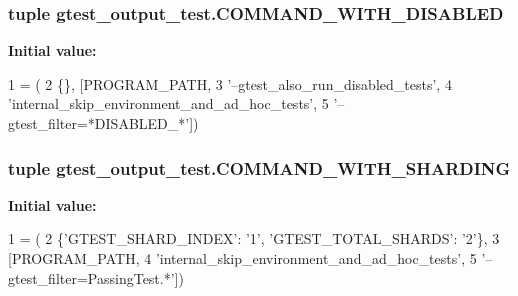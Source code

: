 \subsubsection[{\texorpdfstring{C\+O\+M\+M\+A\+N\+D\+\_\+\+W\+I\+T\+H\+\_\+\+D\+I\+S\+A\+B\+L\+ED}{COMMAND_WITH_DISABLED}}]{\setlength{\rightskip}{0pt plus 5cm}tuple gtest\+\_\+output\+\_\+test.\+C\+O\+M\+M\+A\+N\+D\+\_\+\+W\+I\+T\+H\+\_\+\+D\+I\+S\+A\+B\+L\+ED}\hypertarget{namespacegtest__output__test_a0ef963a39dc8e53616ba2dab9f128def}{}\label{namespacegtest__output__test_a0ef963a39dc8e53616ba2dab9f128def}
{\bfseries Initial value\+:}
\begin{DoxyCode}
1 = (
2     \{\}, [PROGRAM\_PATH,
3          \textcolor{stringliteral}{'--gtest\_also\_run\_disabled\_tests'},
4          \textcolor{stringliteral}{'internal\_skip\_environment\_and\_ad\_hoc\_tests'},
5          \textcolor{stringliteral}{'--gtest\_filter=*DISABLED\_*'}])
\end{DoxyCode}
\subsubsection[{\texorpdfstring{C\+O\+M\+M\+A\+N\+D\+\_\+\+W\+I\+T\+H\+\_\+\+S\+H\+A\+R\+D\+I\+NG}{COMMAND_WITH_SHARDING}}]{\setlength{\rightskip}{0pt plus 5cm}tuple gtest\+\_\+output\+\_\+test.\+C\+O\+M\+M\+A\+N\+D\+\_\+\+W\+I\+T\+H\+\_\+\+S\+H\+A\+R\+D\+I\+NG}\hypertarget{namespacegtest__output__test_a462eef2a00782001d491b7a38a847bec}{}\label{namespacegtest__output__test_a462eef2a00782001d491b7a38a847bec}
{\bfseries Initial value\+:}
\begin{DoxyCode}
1 = (
2     \{\textcolor{stringliteral}{'GTEST\_SHARD\_INDEX'}: \textcolor{stringliteral}{'1'}, \textcolor{stringliteral}{'GTEST\_TOTAL\_SHARDS'}: \textcolor{stringliteral}{'2'}\},
3     [PROGRAM\_PATH,
4      \textcolor{stringliteral}{'internal\_skip\_environment\_and\_ad\_hoc\_tests'},
5      \textcolor{stringliteral}{'--gtest\_filter=PassingTest.*'}])
\end{DoxyCode}
